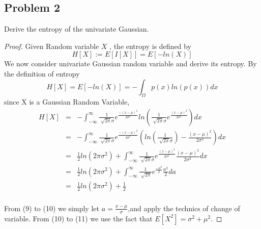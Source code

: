 \documentclass{article}
\begin{document}
\clearpage %
\subsection*{Problem 2}
Derive the entropy of the univariate Gaussian.
\begin{proof}
Given Random variable  $X$ , the entropy is defined by $$H[X]:=E[I[X]]=E[-ln(X)]$$
We now consider univariate Gaussian random variable and derive its entropy.
By the definition of entropy $$H[X]=E[-ln(X)] = -\int_{\Omega}p(x)ln(p(x))dx$$
since X is a Gaussian Random Variable,
\begin{eqnarray}
  H[X] &=& -\int_{-\infty}^{\infty}\frac{1}{\sqrt[]{2\pi}\sigma}e^\frac{-(x-\mu)^2}{2\sigma^2}ln(\frac{1}{\sqrt[]{2\pi}\sigma}e^\frac{(x-\mu)^2}{2\sigma^2})dx\\[5pt]
          &=& -\int_{-\infty}^{\infty}\frac{1}{\sqrt[]{2\pi}\sigma}e^\frac{-(x-\mu)^2}{2\sigma^2}(ln(\frac{1}{\sqrt[]{2\pi}\sigma})-\frac{(x-\mu)^2}{2\sigma^2})dx \\[5pt]
          &=& \frac{1}{2}ln(2\pi\sigma^2)+\int_{-\infty}^{\infty}\frac{1}{\sqrt[]{2\pi}\sigma}e^\frac{(x-\mu)^2}{2\sigma^2}\frac{(x-\mu)^2}{2\sigma^2}dx \\[5pt]
          &=&\frac{1}{2}ln(2\pi\sigma^2)+\int_{-\infty}^{\infty}\frac{1}{\sqrt[]{2\pi}}e^\frac{-a^2}{2}\frac{a^2}{2}da \\[5pt]
          &=&\frac{1}{2}ln(2\pi\sigma^2)+\frac{1}{2}
\end{eqnarray}\\[5pt]
From (9) to (10) we simply let $a=\frac{x-\mu}{\sigma}$,and apply the technics of change of variable.
From (10) to (11) we use the fact that $E[X^2]=\sigma^2+\mu^2 .$
\end{proof}
\end{document}
